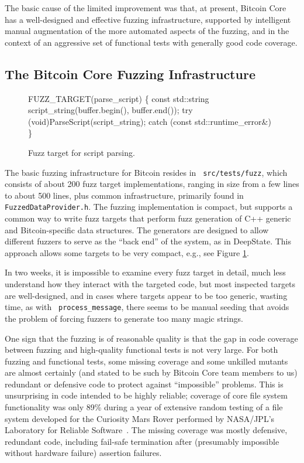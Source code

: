 The basic cause of the limited improvement was that, at present,
Bitcoin Core has a well-designed and effective fuzzing infrastructure,
supported by intelligent manual augmentation of the more automated
aspects of the fuzzing, and in the context of an aggressive set of
functional tests with generally good code coverage.

\subsection{The Bitcoin Core Fuzzing Infrastructure}

\begin{figure}
  {\scriptsize
  \begin{code}
    FUZZ\_TARGET(parse\_script)
\{
    const std::string script\_string(buffer.begin(), buffer.end());
    try {
        (void)ParseScript(script\_string);
    } catch (const std::runtime\_error\&) {
    }
\}
\end{code}
}
\caption{Fuzz target for script parsing.}
\label{script}
\end{figure}
  

\begin{sloppypar}
The basic fuzzing infrastructure for Bitcoin resides in {\tt
  src/tests/fuzz}, which consists of about 200 fuzz target
implementations, ranging in size from a few lines to about 500 lines,
plus common infrastructure, primarily found in {\tt
  FuzzedDataProvider.h}.  The fuzzing implementation is compact, but
supports a common way to write fuzz targets that perform fuzz
generation of C++ generic and Bitcoin-specific data structures.  The
generators are designed to allow different fuzzers to serve as the
``back end'' of the system, as in DeepState.  This approach allows
some targets to be very compact, e.g., see Figure \ref{script}.

In two weeks, it is impossible to examine every fuzz target in detail,
much less understand how they interact with the targeted code, but
most inspected targets are well-designed, and in cases where targets
appear to be too generic, wasting time, as with {\tt
  process\_message}, there seems to be manual seeding that avoids the
problem of forcing fuzzers to generate too many magic strings.
\end{sloppypar}

One sign that the fuzzing is of reasonable quality is that the gap in code
coverage between fuzzing and high-quality
functional tests is not very large.  
For both fuzzing and functional tests, some missing coverage and some
unkilled mutants are almost
certainly (and stated to be such by Bitcoin Core team members to us)
redundant or defensive code to protect against ``impossible''
problems.  This is unsurprising in code intended to be highly reliable;
coverage of core file system functionality was only 89\% during a year of
extensive random testing of a file system developed for the Curiosity
Mars Rover performed by NASA/JPL's Laboratory for Reliable
Software~\cite{ICSEDiff}.  The missing coverage was mostly defensive,
redundant code, including fail-safe termination after (presumably
impossible without hardware failure)
assertion failures.

